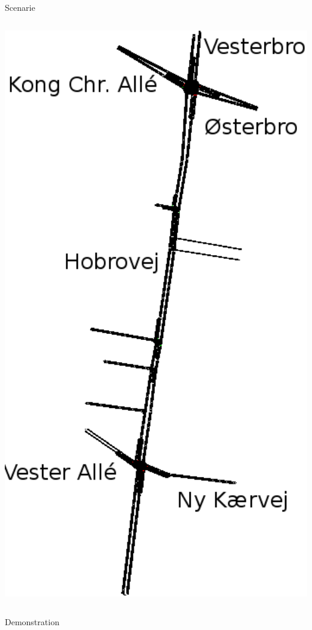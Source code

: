 \begin{frame}{Scenarie}
\begin{columns}
\begin{column}{0.4\textwidth}
\includegraphics[width=1\textwidth]{images/Hobrovej.png}
\end{column}
\end{columns}
\end{frame}

\begin{frame}{Demonstration}
\end{frame}